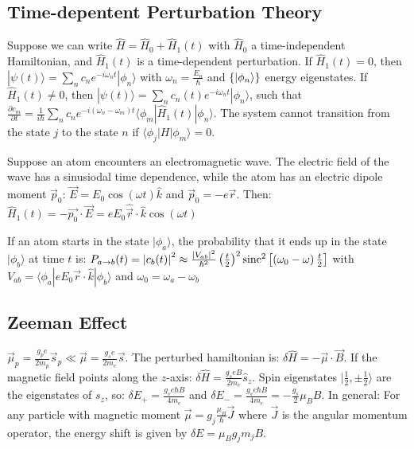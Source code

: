 \subsection{Time-depentent Perturbation Theory}
Suppose we can write $\hat{H} = \hat{H}_0 + \hat{H}_1 (t)$ with $\hat{H}_0$ a
time-independent Hamiltonian, and $\hat{H}_1 (t)$ is a time-dependent perturbation.
If $\hat{H}_1 (t) = 0$, then $| \psi(t) \rangle = \sum_n c_n e^{-i \omega_n t} | \phi_n \rangle$
with $\omega_n = \frac{E_n}{\hbar}$ and $\left\{ | \phi_n \rangle \right\}$
energy eigenstates. If $\hat{H}_1 (t) \neq 0$, then
$| \psi(t) \rangle = \sum_n c_n (t) e^{-i \omega_n t} | \phi_n \rangle$, such that
$\frac{\partial c_m}{\partial t} = \frac{1}{i \hbar} \sum_n c_n e^{-i(\omega_n - \omega_m) t} \langle \phi_m | \hat{H}_1 (t) | \phi_n \rangle$.
The system cannot transition from the state $j$ to the state $n$ if
$\langle \phi_j | H | \phi_m \rangle = 0$.

Suppose an atom encounters an electromagnetic wave. The electric field of the wave
has a sinusiodal time dependence, while the atom has an electric dipole moment
$\vec{p}_0$: $\vec{E} = E_0 \cos(\omega t) \hat{k}$ and $\vec{p}_0 = - e \vec{r}$.
Then: $\hat{H}_1 (t) = - \vec{p_0} \cdot \vec{E} = e E_0 \hat{\vec{r}} \cdot \hat{k}
\cos(\omega t)$

If an atom starts in the state $| \phi_a \rangle$, the probability that it ends
up in the state $| \phi_b \rangle$ at time $t$ is:
$P_{a \rightarrow b} (t) = \left\vert c_b (t) \right\vert^2 \approx \frac{\left\vert V_{ab} \right\vert^2}{\hbar^2}
\left( \frac{t}{2} \right)^2 \text{sinc}^2 \left[ \left( \omega_0 - \omega \right) \frac{t}{2} \right]$
with $V_{ab} = \langle \phi_a | e E_0 \vec{r} \cdot \hat{k} | \phi_b \rangle$ and
$\omega_0 = \omega_a - \omega_b$

\subsection{Zeeman Effect}
$\vec{\mu}_p = \frac{g_p e}{2 m_p} \vec{s}_p \ll \vec{\mu} = \frac{g_s e}{2 m_e} \vec{s}$.
The perturbed hamiltonian is: $\delta \hat{H} = - \vec{\mu} \cdot \vec{B}$. If the
magnetic field points along the $z$-axis: $\delta \hat{H} = \frac{g_s e B}{2 m_e} \hat{s}_z$.
Spin eigenstates $| \frac{1}{2} , \pm \frac{1}{2} \rangle$ are the eigenstates of
$s_z$, so: $\delta E_+ = \frac{g_s e \hbar B}{4 m_e}$ and
$\delta E_- = \frac{g_s e \hbar B}{4 m_e} = - \frac{g_s}{2} \mu_B B$.
In general: For any particle with magnetic moment $\vec{\mu} = g_j \frac{\mu_B}{\hbar} \vec{J}$
where $\vec{J}$ is the angular momentum operator, the energy shift is given by
$\delta E = \mu_B g_j m_j B$.

